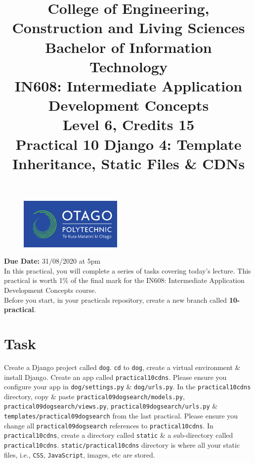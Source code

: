 \documentclass{article}
\author{}
\begin{document}
\begin{figure}
	\centering
	\includegraphics[width=50mm]{./img/logo.png}
\end{figure}

\title{College of Engineering, Construction and Living Sciences\\Bachelor of Information Technology\\IN608: Intermediate Application Development Concepts\\Level 6, Credits 15\\\textbf{Practical 10 Django 4: Template Inheritance, Static Files \& CDNs}} 
\date{}
\maketitle

\textbf{Due Date:} 31/08/2020 at 5pm \\

In this practical, you will complete a series of tasks covering today's lecture. This practical is worth 1\% of the final mark for the IN608: Intermediate Application Development Concepts course. \\

Before you start, in your practicals repository, create a new branch called \textbf{10-practical}.

\section*{Task} 
Create a Django project called \texttt{dog}. \texttt{cd} to \texttt{dog}, create a virtual environment \& install Django. Create an app called \texttt{practical10cdns}. Please ensure you configure your app in \texttt{dog/settings.py} \& \texttt{dog/urls.py}. In the \texttt{practical10cdns} directory, copy \& paste \texttt{practical09dogsearch/models.py}, \texttt{practical09dogsearch/views.py}, \texttt{practical09dogsearch/urls.py} \& \texttt{templates/practical09dogsearch} from the last practical. Please ensure you change all \texttt{practical09dogsearch} references to \texttt{practical10cdns}. In \texttt{practical10cdns}, create a directory called \texttt{static} \& a sub-directory called  \texttt{practical10cdns}. \texttt{static/practical10cdns} directory is where all your static files, i.e., \texttt{CSS}, \texttt{JavaScript}, images, etc are stored. \\
\end{document}
